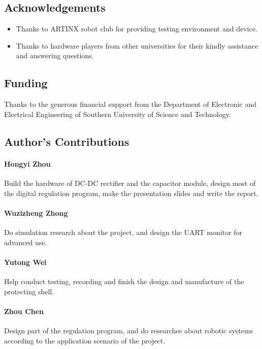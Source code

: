 \documentclass[a4paper,num-refs]{oup-contemporary}
\begin{document}
\subsection{Acknowledgements}
\begin{itemize}
\item Thanks to ARTINX robot club for providing testing environment and device.

\item Thanks to hardware players from other universities for their kindly assistance and answering questions.
\end{itemize}

\subsection{Funding}
Thanks to the generous financial support from the Department of Electronic and Electrical Engineering of Southern University of Science and Technology.

\subsection{Author's Contributions}
\paragraph{Hongyi Zhou}
Build the hardware of DC-DC rectifier and the capacitor module, design most of the digital regulation program, make the presentation slides and write the report.

\paragraph{Wuzizheng Zhong}
Do simulation research about the project, and design the UART monitor for advanced use.

\paragraph{Yutong Wei}
Help conduct testing, recording and finish the design and manufacture of the protecting shell.

\paragraph{Zhou Chen}
Design part of the regulation program, and do researches about robotic systems according to the application scenario of the project.
\end{document}
